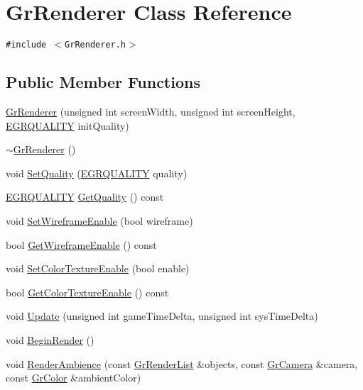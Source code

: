 \hypertarget{class_gr_renderer}{
\section{GrRenderer Class Reference}
\label{class_gr_renderer}
}
{\tt \#include $<$GrRenderer.h$>$}

\subsection*{Public Member Functions}
\begin{CompactItemize}
\item 
\hyperlink{class_gr_renderer_73cd9f551be328f0b6bb0548a52603c1}{GrRenderer} (unsigned int screenWidth, unsigned int screenHeight, \hyperlink{enums_8h_697c1ee1354746841860d5bf9f81c033}{EGRQUALITY} initQuality)
\item 
\hyperlink{class_gr_renderer_50282617350b0dd1666b9f7ea59864cb}{$\sim$GrRenderer} ()
\item 
void \hyperlink{class_gr_renderer_b8ae722c5f5d7667364f0d2f566c83a6}{SetQuality} (\hyperlink{enums_8h_697c1ee1354746841860d5bf9f81c033}{EGRQUALITY} quality)
\item 
\hyperlink{enums_8h_697c1ee1354746841860d5bf9f81c033}{EGRQUALITY} \hyperlink{class_gr_renderer_d86b7160c1b0831ec0ddc4a721b433f0}{GetQuality} () const 
\item 
void \hyperlink{class_gr_renderer_b3dd5cf678f215b7867cf641c2319498}{SetWireframeEnable} (bool wireframe)
\item 
bool \hyperlink{class_gr_renderer_a33160de78d4900342c11166d1658913}{GetWireframeEnable} () const 
\item 
void \hyperlink{class_gr_renderer_ea31969cc28ebbae05209c9df2c56d06}{SetColorTextureEnable} (bool enable)
\item 
bool \hyperlink{class_gr_renderer_d05a7dc01a5500bb3b2a0b0bdd491a36}{GetColorTextureEnable} () const 
\item 
void \hyperlink{class_gr_renderer_7fd1313c1e8a5a9899726a18bdcf8e81}{Update} (unsigned int gameTimeDelta, unsigned int sysTimeDelta)
\item 
void \hyperlink{class_gr_renderer_b9f9a038981e6e4f3de7069202759fdf}{BeginRender} ()
\item 
void \hyperlink{class_gr_renderer_2ab0a1175b2450e0ed213d7d06b5e18e}{RenderAmbience} (const \hyperlink{class_gr_render_list}{GrRenderList} \&objects, const \hyperlink{class_gr_camera}{GrCamera} \&camera, const \hyperlink{class_gr_color}{GrColor} \&ambientColor)

\end{CompactItemize}
